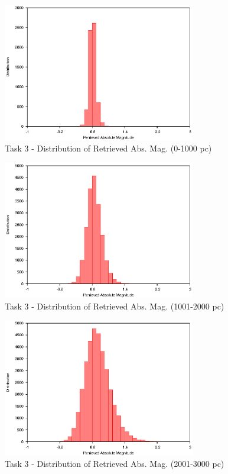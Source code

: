 \documentclass[a4paper,12pt]{article}
\begin{document}
\begin{figure}[H]
\centering
\includegraphics[width=0.75\textwidth]{./Task3/Bin1}
\caption{Task 3 -  Distribution of Retrieved Abs. Mag. (0-1000 pc)}
\label{fig:t3bin1}
\end{figure}

\begin{figure}[H]
\centering
\includegraphics[width=0.75\textwidth]{./Task3/Bin2}
\caption{Task 3 - Distribution of Retrieved Abs. Mag. (1001-2000 pc)}
\label{fig:t3bin2}
\end{figure}

\begin{figure}[H]
\centering
\includegraphics[width=0.75\textwidth]{./Task3/Bin3}
\caption{Task 3 - Distribution of Retrieved Abs. Mag. (2001-3000 pc)}
\label{fig:t3bin3}
\end{figure}
\end{document}
